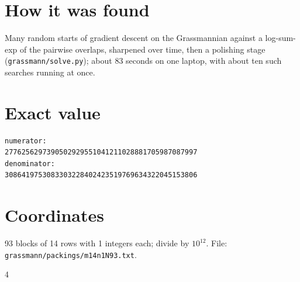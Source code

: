 \documentclass[11pt,a4paper]{article}
\begin{document}
\section{How it was found}
Many random starts of gradient descent on the Grassmannian against a log-sum-exp of the pairwise overlaps, sharpened over time, then a polishing stage (\texttt{grassmann/solve.py}); about 83 seconds on one laptop, with about ten such searches running at once.


\appendix
\section{Exact value}
{\small
\begin{verbatim}
numerator:
2776256297390502929551041211028881705987087997
denominator:
3086419753083303228402423519769634322045153806
\end{verbatim}}

\section{Coordinates}
93 blocks of 14 rows with 1 integers each; divide by $10^{12}$. File: \texttt{grassmann/packings/m14n1N93.txt}.
{\tiny
\begin{multicols}{4}
\end{multicols}}
\end{document}
